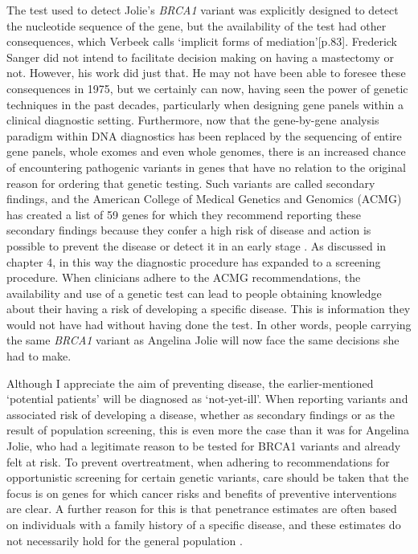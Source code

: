 The test used to detect Jolie’s \textsl{BRCA1} variant was explicitly designed to detect the nucleotide sequence of the gene, but the availability of the test had other consequences, which Verbeek calls ‘implicit forms of mediation’[p.83]. 
Frederick Sanger did not intend to facilitate decision making on having a mastectomy or not. 
However, his work did just that. He may not have been able to foresee these consequences in 1975, but we certainly can now, having seen the power of genetic techniques in the past decades, particularly when designing gene panels within a clinical diagnostic setting. 
Furthermore, now that the gene-by-gene analysis paradigm within DNA diagnostics has been replaced by the sequencing of entire gene panels, whole exomes and even whole genomes, there is an increased chance of encountering pathogenic variants in genes that have no relation to the original reason for ordering that genetic testing. 
Such variants are called secondary findings, and the American College of Medical Genetics and Genomics (ACMG) has created a list of 59 genes for which they recommend reporting these secondary findings because they confer a high risk of disease and action is possible to prevent the disease or detect it in an early stage \cite{Kalia_2016}. 
As discussed in chapter 4, in this way the diagnostic procedure has expanded to a screening procedure. 
When clinicians adhere to the ACMG recommendations, the availability and use of a genetic test can lead to people obtaining knowledge about their having a risk of developing a specific disease. 
This is information they would not have had without having done the test. 
In other words, people carrying the same \textsl{BRCA1} variant as Angelina Jolie will now face the same decisions she had to make.

Although I appreciate the aim of preventing disease, the earlier-mentioned ‘potential patients’ will be diagnosed as ‘not-yet-ill’. 
When reporting variants and associated risk of developing a disease, whether as secondary findings or as the result of population screening, this is even more the case than it was for Angelina Jolie, who had a legitimate reason to be tested for BRCA1 variants and already felt at risk. 
To prevent overtreatment, when adhering to recommendations for opportunistic screening for certain genetic variants, care should be taken that the focus is on genes for which cancer risks and benefits of preventive interventions are clear. 
A further reason for this is that penetrance estimates are often based on individuals with a family history of a specific disease, and these estimates do not necessarily hold for the general population \cite{Wentzensen_2018}.


